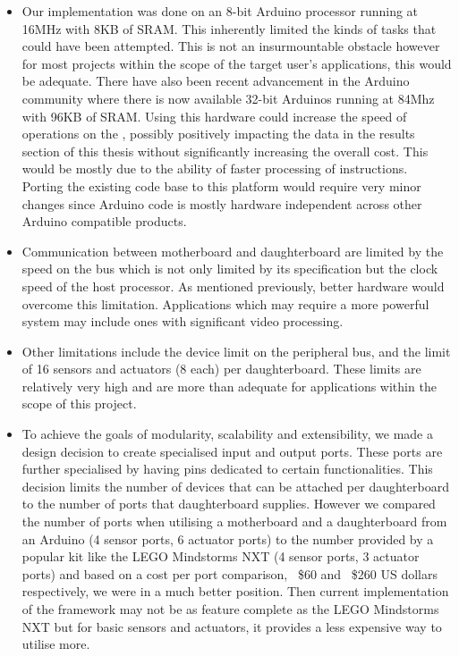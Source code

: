 \begin{itemize}
\item Our implementation was done on an 8-bit Arduino processor running at 16MHz with 8KB of SRAM. This inherently limited the kinds of tasks that could have been attempted. This is not an insurmountable obstacle however for most projects within the scope of the target user's applications, this would be adequate. There have also been recent advancement in the Arduino community where there is now available 32-bit Arduinos running at 84Mhz with 96KB of SRAM. Using this hardware could increase the speed of operations on the \xten, possibly positively impacting the data in the results section of this thesis without significantly increasing the overall cost. This would be mostly due to the ability of faster processing of instructions. Porting the existing code base to this platform would require very minor changes since Arduino code is mostly hardware independent across other Arduino compatible products.

\item Communication between motherboard and daughterboard are limited by the speed on the \iic bus which is not only limited by its specification but the clock speed of the host processor. As mentioned previously, better hardware would overcome this limitation. Applications which may require a more powerful system may include ones with significant video processing.
\item Other limitations include the  device limit on the peripheral bus, and the limit of 16 sensors and actuators (8 each) per daughterboard. These limits are relatively very high and are more than adequate for applications within the scope of this project.
\item To achieve the goals of modularity, scalability and extensibility, we made a design decision to create specialised input and output ports. These ports are further specialised by having pins dedicated to certain functionalities. This decision limits the number of devices that can be attached per daughterboard to the number of ports that daughterboard supplies. However we compared the number of ports when utilising a motherboard and a daughterboard from an Arduino (4 sensor ports, 6 actuator ports) to the number provided by a popular kit like the LEGO Mindstorms NXT (4 sensor ports, 3 actuator ports) and based on a cost per port comparison, ~\$60 and ~\$260 US dollars respectively, we were in a much better position. Then current implementation of the \xten framework may not be as feature complete as the LEGO Mindstorms NXT but for basic sensors and actuators, it provides a less expensive way to utilise more.
\end{itemize}

